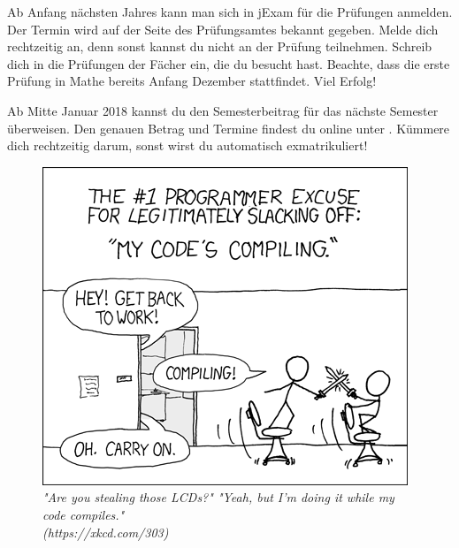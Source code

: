 \begin{itemize}[leftmargin=*]
\newpage


Ab Anfang nächsten Jahres kann man sich in jExam für die Prüfungen anmelden. Der
Termin wird auf der Seite des Prüfungsamtes bekannt gegeben. Melde dich
rechtzeitig an, denn sonst kannst du nicht an der Prüfung teilnehmen. Schreib
dich in die Prüfungen der Fächer ein, die du besucht hast. Beachte, dass die
erste Prüfung in Mathe bereits Anfang Dezember stattfindet. Viel Erfolg!

Ab Mitte Januar 2018 kannst du den Semesterbeitrag für das nächste Semester
überweisen. Den genauen Betrag und Termine findest du online unter
. Kümmere dich rechtzeitig darum,
sonst wirst du automatisch exmatrikuliert!

\end{itemize}

\vfill

\begin{figure}[h!]
\centering
\includegraphics[scale=.7]{img/xkcd/compiling.png}
\caption*{{\small \textit{"Are you stealing those LCDs?" "Yeah, but I'm doing it while my code compiles."\\\hspace*{1mm}\hfill(https://xkcd.com/303)}}}
\end{figure}
